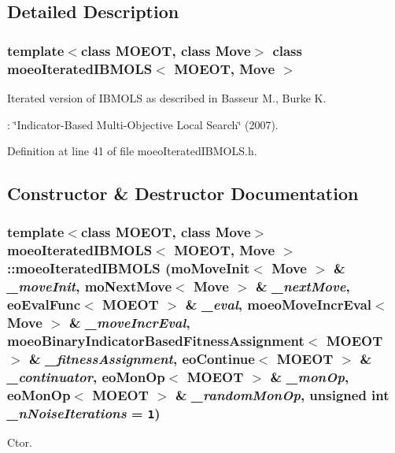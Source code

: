 \subsection{Detailed Description}
\subsubsection*{template$<$class MOEOT, class Move$>$ class moeo\-Iterated\-IBMOLS$<$ MOEOT, Move $>$}

Iterated version of IBMOLS as described in Basseur M., Burke K. 

: \char`\"{}Indicator-Based Multi-Objective Local Search\char`\"{} (2007). 



Definition at line 41 of file moeo\-Iterated\-IBMOLS.h.

\subsection{Constructor \& Destructor Documentation}
\subsubsection{\setlength{\rightskip}{0pt plus 5cm}template$<$class MOEOT, class Move$>$ \bf{moeo\-Iterated\-IBMOLS}$<$ MOEOT, Move $>$::\bf{moeo\-Iterated\-IBMOLS} (mo\-Move\-Init$<$ Move $>$ \& {\em \_\-move\-Init}, mo\-Next\-Move$<$ Move $>$ \& {\em \_\-next\-Move}, \bf{eo\-Eval\-Func}$<$ MOEOT $>$ \& {\em \_\-eval}, \bf{moeo\-Move\-Incr\-Eval}$<$ Move $>$ \& {\em \_\-move\-Incr\-Eval}, \bf{moeo\-Binary\-Indicator\-Based\-Fitness\-Assignment}$<$ MOEOT $>$ \& {\em \_\-fitness\-Assignment}, \bf{eo\-Continue}$<$ MOEOT $>$ \& {\em \_\-continuator}, \bf{eo\-Mon\-Op}$<$ MOEOT $>$ \& {\em \_\-mon\-Op}, \bf{eo\-Mon\-Op}$<$ MOEOT $>$ \& {\em \_\-random\-Mon\-Op}, unsigned int {\em \_\-n\-Noise\-Iterations} = {\tt 1})\hspace{0.3cm}{\tt  [inline]}}\label{classmoeoIteratedIBMOLS_67352bb5d797f20e767a4f0fa6d80f93}


Ctor. 

